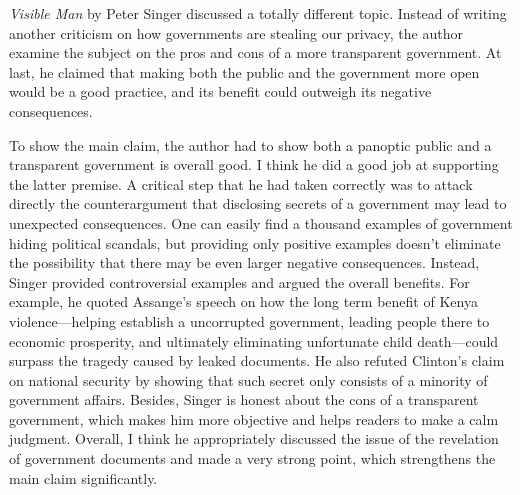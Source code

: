\documentclass{writing}
\begin{document}
\emph{Visible Man} by Peter Singer discussed a totally different topic.
Instead of writing another criticism on how governments are stealing our
privacy, the author examine the subject on the pros and cons of a more
transparent government. At last, he claimed that making both the public
and the government more open would be a good practice, and its benefit
could outweigh its negative consequences.

To show the main claim, the author had to show both a panoptic public
and a transparent government is overall good. I think he did a good job
at supporting the latter premise. A critical step that he had taken
correctly was to attack directly the counterargument that disclosing
secrets of a government may lead to unexpected consequences. One can
easily find a thousand examples of government hiding political scandals,
but providing only positive examples doesn't eliminate the possibility
that there may be even larger negative consequences. Instead, Singer
provided controversial examples and argued the overall benefits. For
example, he quoted Assange's speech on how the long term benefit of
Kenya violence---helping establish a uncorrupted government, leading
people there to economic prosperity, and ultimately eliminating
unfortunate child death---could surpass the tragedy caused by leaked
documents. He also refuted Clinton's claim on national security by
showing that such secret only consists of a minority of government
affairs. Besides, Singer is honest about the cons of a transparent
government, which makes him more objective and helps readers to make a
calm judgment. Overall, I think he appropriately discussed the issue of
the revelation of government documents and made a very strong point,
which strengthens the main claim significantly.
\end{document}

